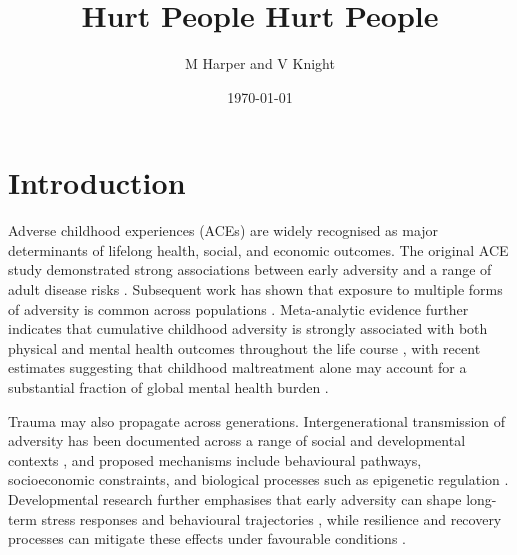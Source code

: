 \documentclass{article}
\title{Hurt People Hurt People}
\author{M Harper and V Knight}
\date{\today}
\begin{document}
\maketitle


\section{Introduction}

Adverse childhood experiences (ACEs) are widely recognised as major
determinants of lifelong health, social, and economic outcomes. The original
ACE study demonstrated strong associations between early adversity and a range
of adult disease risks \cite{felitti1998relationship}. Subsequent work has
shown that exposure to multiple forms of adversity is common across populations
\cite{joshi2021prevalence}. Meta-analytic evidence further indicates that
cumulative childhood adversity is strongly associated with both physical and
mental health outcomes throughout the life course
\cite{hughes2017effect}, with recent estimates suggesting that childhood
maltreatment alone may account for a substantial fraction of global mental
health burden \cite{grummitt2024burden}.

Trauma may also propagate across generations. Intergenerational transmission of
adversity has been documented across a range of social and developmental
contexts \cite{madigan2019intergenerational,schickedanz2021intergenerational},
and proposed mechanisms include behavioural pathways, socioeconomic
constraints, and biological processes such as epigenetic regulation
\cite{yehuda2016intergenerational}. Developmental research further emphasises
that early adversity can shape long-term stress responses and behavioural
trajectories \cite{shonkoff2012lifelong}, while resilience and recovery
processes can mitigate these effects under favourable conditions
\cite{masten2014ordinary,skolnick2023association}.
\end{document}
